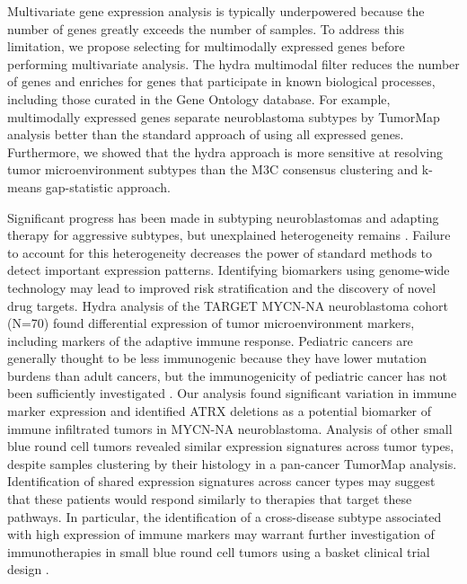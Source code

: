 \documentclass[10pt,letterpaper]{article}
\begin{document}
Multivariate gene expression analysis is typically underpowered because the number of genes greatly exceeds the number of samples. To address this limitation, we propose selecting for multimodally expressed genes before performing multivariate analysis. The hydra multimodal filter reduces the number of genes and enriches for genes that participate in known biological processes, including those curated in the Gene Ontology database. For example, multimodally expressed genes separate neuroblastoma subtypes by TumorMap analysis better than the standard approach of using all expressed genes. Furthermore, we showed that the hydra approach is more sensitive at resolving tumor microenvironment subtypes than the M3C consensus clustering and k-means gap-statistic approach. 

Significant progress has been made in subtyping neuroblastomas and adapting therapy for aggressive subtypes, but unexplained heterogeneity remains \cite{morgensternChallengeDefiningUltrahighrisk2019}. Failure to account for this heterogeneity decreases the power of standard methods to detect important expression patterns. Identifying biomarkers using genome-wide technology may lead to improved risk stratification and the discovery of novel drug targets. Hydra analysis of the TARGET MYCN-NA neuroblastoma cohort (N=70) found differential expression of tumor microenvironment markers, including markers of the adaptive immune response. Pediatric cancers are generally thought to be less immunogenic because they have lower mutation burdens than adult cancers, but the immunogenicity of pediatric cancer has not been sufficiently investigated \cite{majzner2017harnessing}. Our analysis found significant variation in immune marker expression and identified ATRX deletions as a potential biomarker of immune infiltrated tumors in MYCN-NA neuroblastoma. Analysis of other small blue round cell tumors revealed similar expression signatures across tumor types, despite samples clustering by their histology in a pan-cancer TumorMap analysis. Identification of shared expression signatures across cancer types may suggest that these patients would respond similarly to therapies that target these pathways. In particular, the identification of a cross-disease subtype associated with high expression of immune markers may warrant further investigation of immunotherapies in small blue round cell tumors using a basket clinical trial design \cite{cunananEfficientBasketTrial2017}.
\end{document}
